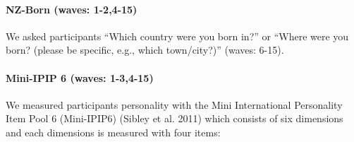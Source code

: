 \documentclass[
  letterpaper,
  DIV=11,
  numbers=noendperiod]{scrartcl}
\let\oldparagraph\paragraph
\renewcommand{\paragraph}[1]{\oldparagraph{#1}\mbox{}}
\begin{document}
\hypertarget{nz-born-waves-1-24-15}{%
\paragraph{NZ-Born (waves: 1-2,4-15)}\label{nz-born-waves-1-24-15}}

We asked participants ``Which country were you born in?'' or ``Where
were you born? (please be specific, e.g., which town/city?)'' (waves:
6-15).

\hypertarget{mini-ipip-6-waves-1-34-15}{%
\paragraph{Mini-IPIP 6 (waves:
1-3,4-15)}\label{mini-ipip-6-waves-1-34-15}}

We measured participants personality with the Mini International
Personality Item Pool 6 (Mini-IPIP6) (Sibley et al. 2011) which consists
of six dimensions and each dimensions is measured with four items:
\end{document}
